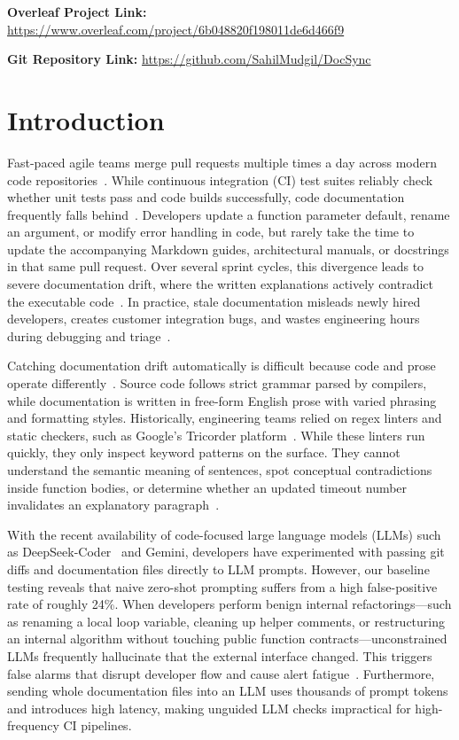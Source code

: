 \documentclass[12pt,onecolumn,draftclsnofoot]{IEEEtran}
\begin{document}
\noindent\textbf{Overleaf Project Link:} \url{https://www.overleaf.com/project/6b048820f198011de6d466f9}

\noindent\textbf{Git Repository Link:} \url{https://github.com/SahilMudgil/DocSync}

\section{Introduction}
Fast-paced agile teams merge pull requests multiple times a day across modern code repositories~\cite{winters2020google}. While continuous integration (CI) test suites reliably check whether unit tests pass and code builds successfully, code documentation frequently falls behind~\cite{wen2019refactoring}. Developers update a function parameter default, rename an argument, or modify error handling in code, but rarely take the time to update the accompanying Markdown guides, architectural manuals, or docstrings in that same pull request. Over several sprint cycles, this divergence leads to severe documentation drift, where the written explanations actively contradict the executable code~\cite{wang2024docsync}. In practice, stale documentation misleads newly hired developers, creates customer integration bugs, and wastes engineering hours during debugging and triage~\cite{allamanis2018survey}.

Catching documentation drift automatically is difficult because code and prose operate differently~\cite{chen2024drift}. Source code follows strict grammar parsed by compilers, while documentation is written in free-form English prose with varied phrasing and formatting styles. Historically, engineering teams relied on regex linters and static checkers, such as Google's Tricorder platform~\cite{sadowski2015tricorder}. While these linters run quickly, they only inspect keyword patterns on the surface. They cannot understand the semantic meaning of sentences, spot conceptual contradictions inside function bodies, or determine whether an updated timeout number invalidates an explanatory paragraph~\cite{zhang2024review}.

With the recent availability of code-focused large language models (LLMs) such as DeepSeek-Coder~\cite{deepseekcoder2024} and Gemini, developers have experimented with passing git diffs and documentation files directly to LLM prompts. However, our baseline testing reveals that naive zero-shot prompting suffers from a high false-positive rate of roughly 24\%. When developers perform benign internal refactorings---such as renaming a local loop variable, cleaning up helper comments, or restructuring an internal algorithm without touching public function contracts---unconstrained LLMs frequently hallucinate that the external interface changed. This triggers false alarms that disrupt developer flow and cause alert fatigue~\cite{zhou2023eval}. Furthermore, sending whole documentation files into an LLM uses thousands of prompt tokens and introduces high latency, making unguided LLM checks impractical for high-frequency CI pipelines.
\end{document}
